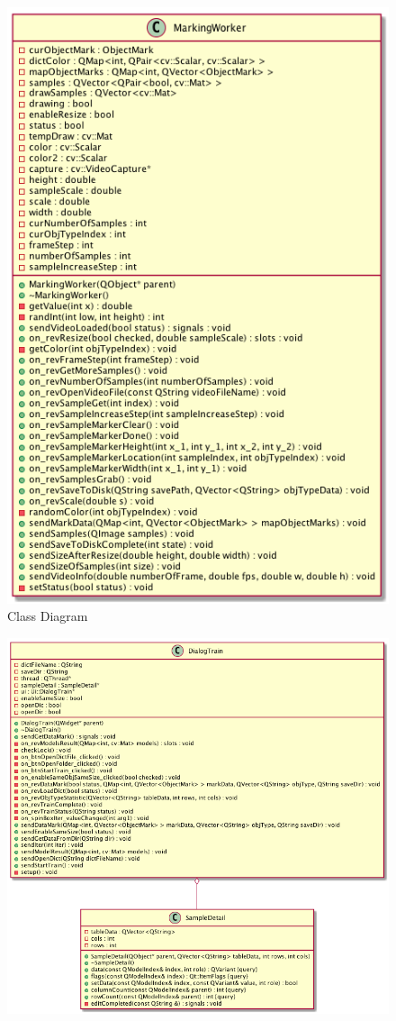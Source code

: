 \begin{center}
\begin{figure}[H]
    \centering
    \includegraphics[height=0.8\textheight]{Chapters/Fig/wmarkerd}
    \caption{Class Diagram}
    \label{fig:cd-mworker}
  \end{figure}
  \begin{figure}[H]
    \centering
    \includegraphics[height=0.65\textheight]{Chapters/Fig/dtraind}

\end{figure}
\end{center}
